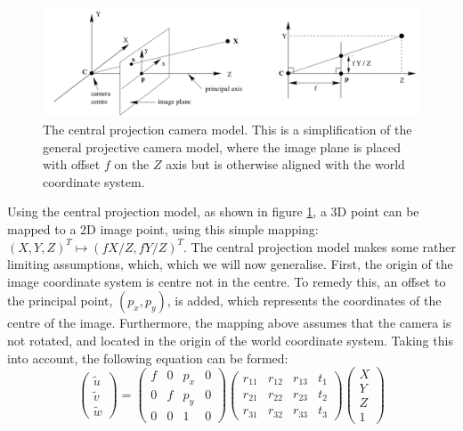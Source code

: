 \begin{figure}
\begin{center}
\includegraphics[width=1.0\textwidth]{figures/central_projection_camera.png}
\end{center}
\caption{The central projection camera model. This is a simplification of the general projective camera model, where the image plane is placed with offset $f$ on the $Z$ axis but is otherwise aligned with the world coordinate system.}
\label{fig:central_projection_camera} %
\end{figure}

Using the central projection model, as shown in figure \ref{fig:central_projection_camera}, a 3D point can be mapped to a 2D image point, using this simple mapping: $(X,Y,Z)^T\mapsto(fX/Z,fY/Z)^T$.
The central projection model makes some rather limiting assumptions, which, which we will now generalise.
First, the origin of the image coordinate system is centre not in the centre.
To remedy this, an offset to the principal point, $(p_{x}, p_{y})$, is added, which represents the coordinates of the centre of the image.
Furthermore, the mapping above assumes that the camera is not rotated, and located in the origin of the world coordinate system. Taking this into account, the following equation can be formed:
\begin{equation}\label{eq:projection1}
\begin{pmatrix}	\tilde{u}\\\tilde{v}\\\tilde{w}\end{pmatrix} = 
\begin{pmatrix}
	f & 0 & p_{x} & 0\\
	0 & f & p_{y} & 0\\
	0 & 0 & 1 & 0
\end{pmatrix}
\begin{pmatrix}
	r_{11} & r_{12} & r_{13} & t_{1}\\
	r_{21} & r_{22} & r_{23} & t_{2}\\
	r_{31} & r_{32} & r_{33} & t_{3}
\end{pmatrix}
\begin{pmatrix}	X\\Y\\Z\\1\end{pmatrix}
\end{equation}

